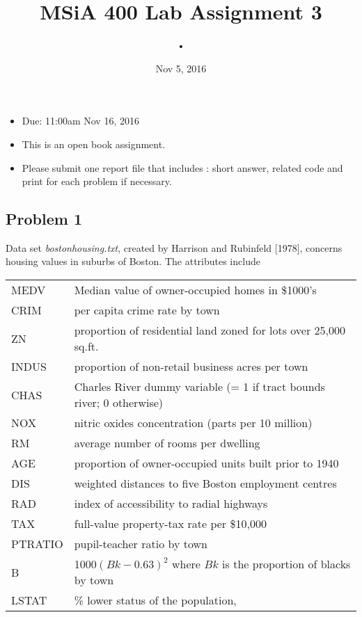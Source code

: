 \documentclass{article}
\author{•}
\title{MSiA 400 Lab Assignment 3} %
\date{Nov 5, 2016}
\begin{document}
\maketitle

\begin{itemize}
\item Due: 11:00am Nov 16, 2016
\item This is an open book assignment. 
\item Please submit one report file that includes : short answer, related code and print for each problem if necessary.
\end{itemize}
\vspace{0.5cm}




\subsection*{Problem 1}
Data set \textit{bostonhousing.txt}, created by Harrison and Rubinfeld [1978], concerns housing values in suburbs of Boston. The attributes include
\vspace{0.3cm}

\begin{tabular}{ll}
 MEDV & Median value of owner-occupied homes in \$1000's\\
 CRIM & per capita crime rate by town\\
 ZN & proportion of residential land zoned for lots over 25,000 sq.ft.\\
 INDUS & proportion of non-retail business acres per town\\
 CHAS & Charles River dummy variable (= 1 if tract bounds river; 0 otherwise)\\
 NOX & nitric oxides concentration (parts per 10 million) \\
 RM & average number of rooms per dwelling\\
 AGE & proportion of owner-occupied units built prior to 1940\\
 DIS & weighted distances to five Boston employment centres\\
 RAD & index of accessibility to radial highways\\
 TAX & full-value property-tax rate per \$10,000\\
 PTRATIO & pupil-teacher ratio by town\\
 B & 1000$(Bk - 0.63)^2$ where $Bk$ is the proportion of blacks by town\\
 LSTAT & \% lower status of the population, \\
\end{tabular}
\vspace{0.3cm}
\end{document}

